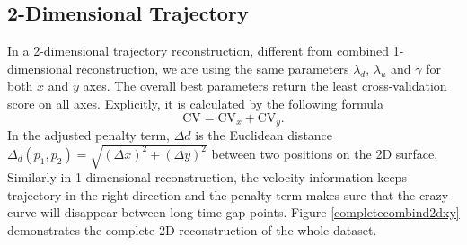 \subsection{2-Dimensional Trajectory}

In a 2-dimensional trajectory reconstruction, different from combined 1-dimensional reconstruction, we are using the same parameters $\lambda_d$, $\lambda_u$ and $\gamma$ for both $x$ and $y$ axes. The overall best parameters return the least cross-validation score on all axes. Explicitly, it is calculated by the following formula 
\begin{equation}
\mbox{CV}=\mbox{CV}_x+\mbox{CV}_y.
\end{equation}
In the adjusted penalty term, $\Delta d$ is the Euclidean distance $\Delta_d(p_1,p_2)=\sqrt{(\Delta x)^2+(\Delta y)^2}$ between two positions on the 2D surface. Similarly in 1-dimensional reconstruction, the velocity information keeps trajectory in the right direction and the penalty term makes sure that the crazy curve will disappear between long-time-gap points. Figure \ref{completecombind2dxy} demonstrates the complete 2D reconstruction of the whole dataset.  

